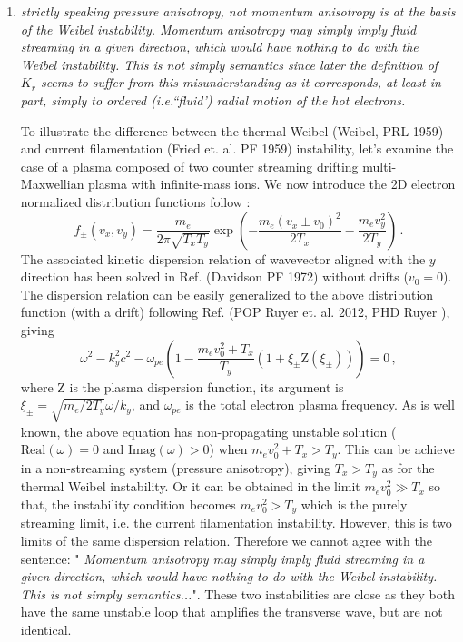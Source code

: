 \documentclass{article}
\begin{document}
\begin{enumerate}
\item \textit{strictly speaking pressure anisotropy, not momentum anisotropy is at the basis of the Weibel instability. Momentum anisotropy may simply imply fluid streaming in a given direction, which would have nothing to do with the Weibel instability. This is not simply semantics since later the definition of $K_r$ seems to suffer from this misunderstanding as it corresponds, at least in part, simply to ordered (i.e.``fluid') radial motion of the hot electrons. }

To illustrate the difference between the thermal Weibel (Weibel, PRL 1959) and current filamentation (Fried et. al. PF 1959) instability, let's examine the case of a plasma composed of two counter streaming drifting multi-Maxwellian plasma with infinite-mass ions.
We now introduce the 2D electron normalized  distribution functions follow :
 \begin{equation}
f_{ \pm}(v_x, v_y)  = \frac{ m_e }{2 \pi \sqrt{  T_x T_y  } }\exp\left( -\frac{ m_e (v_x \pm v_0)^2 }{ 2T_x }  -  \frac{ m_e v_y^2 }{ 2 T_y }\right) \, .
 \end{equation}
The associated kinetic dispersion relation of wavevector aligned with the $y$ direction has been solved in Ref.  (Davidson PF 1972) without drifts ($v_0=0$). The dispersion relation can be easily generalized to the above distribution function (with a drift)
following Ref. (POP Ruyer et. al. 2012, PHD Ruyer ),  giving
 \begin{equation}
 \omega^2 -k_y^2c^2 -  \omega_{pe}\left( 
1 -  \frac{ m_e v_0^2  + T_x }{ T_y }  ( 1 +\xi_\pm \mathrm{ Z }(\xi_\pm)  ) 
\right) =0 \, ,
 \end{equation}
where $ \mathrm{ Z }$ is the plasma dispersion function, its argument is $\xi_\pm =\sqrt{  m_e/2 T_y  }   \omega/k_y$, and 
$\omega_{pe}$ is the total electron plasma frequency. As is well known, the above equation has non-propagating unstable solution ($\mathrm{Real}(\omega)=0$ and $\mathrm{Imag}(\omega)>0$) when $m_e v_0^2  + T_x > T_y$.
This can be achieve in a non-streaming system (pressure anisotropy), giving $T_x > T_y$ as for the thermal Weibel instability. 
Or it can be obtained in the limit $m_e v_0^2  \gg T_x$ so that, the instability condition becomes  $m_e v_0^2  > T_y$ which is the purely streaming limit, i.e.  the current filamentation instability.
However, this is two limits of the same dispersion relation. Therefore we cannot agree with the sentence: " \textit{Momentum anisotropy may simply imply fluid streaming in a given direction, which would have nothing to do with the Weibel instability. This is not simply semantics...}". 
These two instabilities are   close as they both   have the same unstable loop that amplifies the transverse wave, but are not identical.


\end{enumerate}
\end{document}
